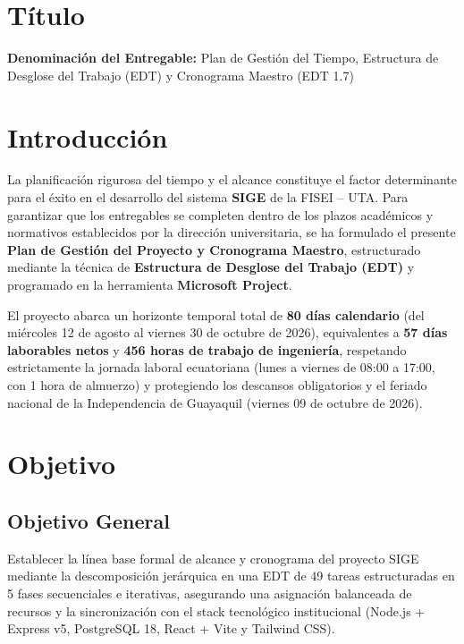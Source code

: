 \documentclass[12pt,a4paper]{article}
\begin{document}

\vspace{0.25cm}
\section{Título}
\textbf{Denominación del Entregable:} Plan de Gestión del Tiempo, Estructura de Desglose del Trabajo (EDT) y Cronograma Maestro (EDT 1.7)



\section{Introducción}
La planificación rigurosa del tiempo y el alcance constituye el factor determinante para el éxito en el desarrollo del sistema \textbf{SIGE} de la FISEI -- UTA. Para garantizar que los entregables se completen dentro de los plazos académicos y normativos establecidos por la dirección universitaria, se ha formulado el presente \textbf{Plan de Gestión del Proyecto y Cronograma Maestro}, estructurado mediante la técnica de \textbf{Estructura de Desglose del Trabajo (EDT)} y programado en la herramienta \textbf{Microsoft Project}.

El proyecto abarca un horizonte temporal total de \textbf{80 días calendario} (del miércoles 12 de agosto al viernes 30 de octubre de 2026), equivalentes a \textbf{57 días laborables netos} y \textbf{456 horas de trabajo de ingeniería}, respetando estrictamente la jornada laboral ecuatoriana (lunes a viernes de 08:00 a 17:00, con 1 hora de almuerzo) y protegiendo los descansos obligatorios y el feriado nacional de la Independencia de Guayaquil (viernes 09 de octubre de 2026).

\section{Objetivo}

\subsection{Objetivo General}
Establecer la línea base formal de alcance y cronograma del proyecto SIGE mediante la descomposición jerárquica en una EDT de 49 tareas estructuradas en 5 fases secuenciales e iterativas, asegurando una asignación balanceada de recursos y la sincronización con el stack tecnológico institucional (Node.js + Express v5, PostgreSQL 18, React + Vite y Tailwind CSS).
\end{document}
